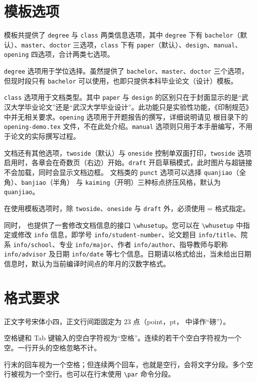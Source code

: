 \section{模板选项}
模板共提供了 \verb|degree| 与 \verb|class| 两类信息选项，其中 \verb|degree| 下有 \verb|bachelor|（默认）、\verb|master|、\verb|doctor| 三选项，\verb|class| 下有 \verb|paper|（默认）、\verb|design|、\verb|manual|、\verb|opening| 四选项，合计两类七选项。

\verb|degree| 选项用于学位选择。虽然提供了 \verb|bachelor|、\verb|master|、\verb|doctor| 三个选项，但现时段只有 \verb|bachelor| 可以使用，也即只提供本科毕业论文（设计）模板。

\verb|class| 选项用于文档类型。其中 \verb|paper| 与 \verb|design| 的区别只在于封面显示的是“武汉大学毕业论文”还是“武汉大学毕业设计”。此功能只是实验性功能，《印制规范》中并无相关要求。\verb|opening| 选项用于开题报告的撰写，详细说明请见 根目录下的 \verb|opening-demo.tex| 文件，不在此处介绍。\verb|manual| 选项则只用于本手册编写，不用于论文的实际撰写过程。

文档还有其他选项，\verb|twoside|（默认）与 \verb|oneside| 控制单双面打印，\verb|twoside| 选项启用时，各章会在奇数页（右边）开始。\verb|draft| 开启草稿模式，此时图片与超链接不会加载，同时会显示文档边框。\CTeX{} 文档类的 \verb|punct| 选项可以选择 \verb|quanjiao|（全角）、\verb|banjiao|（半角） 与 \verb|kaiming|（开明）三种标点挤压风格，默认为 \verb|quanjiao|。

在使用模板选项时，除 \verb|twoside|、\verb|oneside| 与 \verb|draft| 外，必须使用  =  格式指定。

同时，\WhuThesis{} 也提供了一套修改文档信息的接口 \verb|\whusetup|。您可以在 \verb|\whusetup| 中指定或修改 \verb|info| 信息，即学号 \verb|info/student-number|、论文题目 \verb|info/title|、院系 \verb|info/school|、专业 \verb|info/major|、作者 \verb|info/author|、指导教师与职称 \verb|info/advisor| 及日期 \verb|info/date| 等七个信息。日期请以格式给出，当未给出日期信息时，默认为当前编译时间点的年月的汉数字格式。

\section{格式要求}
正文字号宋体小四，正文行间距固定为 23 点（point，pt， 中译作“磅”）。

空格键和 Tab       键输入的空白字符视为“空格”。连续的若干个空白字符视为一个空。一行开头的空格忽略不计。\par
行末的回车视为一个空格；但连续两个回车，也就是空行，会将文字分段。多个空行被视为一个空行。也可以在行末使用 \verb|\par| 命令分段。



